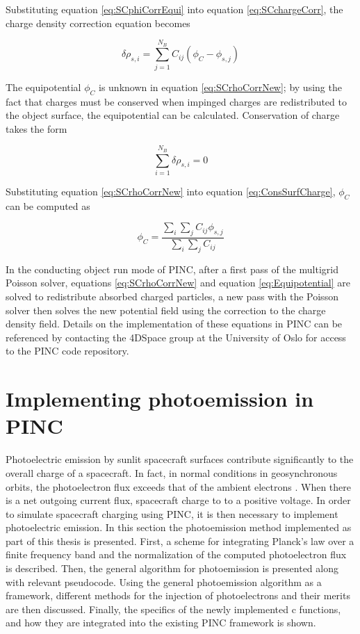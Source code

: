 Substituting equation \ref{eq:SCphiCorrEqui} into equation \ref{eq:SCchargeCorr}, the charge density correction equation becomes

\begin{equation}\label{eq:SCrhoCorrNew}
    \delta \rho_{s,i} = \sum^{N_B}_{j=1} C_{ij} (\phi_C - \phi_{s,j})
\end{equation}

The equipotential $\phi_C$ is unknown in equation \ref{eq:SCrhoCorrNew}; by using the fact that charges must be conserved when impinged charges are redistributed to the object surface, the equipotential can be calculated. Conservation of charge takes the form

\begin{equation}\label{eq:ConsSurfCharge}
    \sum^{N_B}_{i=1} \delta \rho_{s,i} = 0
\end{equation}

Substituting equation \ref{eq:SCrhoCorrNew} into equation \ref{eq:ConsSurfCharge}, $\phi_C$ can be computed as

\begin{equation}\label{eq:Equipotential}
    \phi_C = \frac{\sum_i \sum_j C_{ij} \phi_{s,j}}{\sum_i \sum_j C_{ij}}
\end{equation}

In the conducting object run mode of PINC, after a first pass of the multigrid Poisson solver, equations \ref{eq:SCrhoCorrNew} and equation \ref{eq:Equipotential} are solved to redistribute absorbed charged particles, a new pass with the Poisson solver then solves the new potential field using the correction to the charge density field. Details on the implementation of these equations in PINC can be referenced by contacting the 4DSpace group at the University of Oslo for access to the PINC code repository.


\section{Implementing photoemission in PINC}

Photoelectric emission by sunlit spacecraft surfaces contribute significantly to the overall charge of a spacecraft. In fact, in normal conditions in geosynchronous orbits, the photoelectron flux exceeds that of the ambient electrons . When there is a net outgoing current flux, spacecraft charge to to a positive voltage. In order to simulate spacecraft charging using PINC, it is then necessary to implement photoelectric emission. In this section the photoemission method implemented as part of this thesis is presented. First, a scheme for integrating Planck's law over a finite frequency band and the normalization of the  computed photoelectron flux is described. Then, the general algorithm for photoemission is presented along with relevant pseudocode. Using the general photoemission algorithm as a framework, different methods for the injection of photoelectrons and their merits are then discussed. Finally, the specifics of the newly implemented c functions, and how they are integrated into the existing PINC framework is shown.



